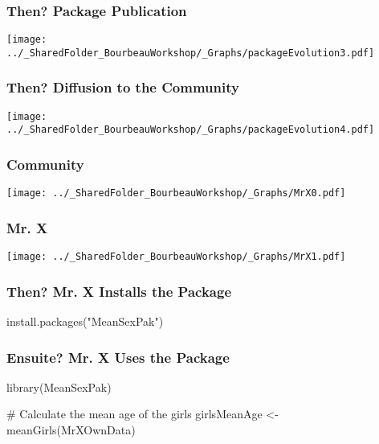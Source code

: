 \documentclass{beamer}
\begin{document}
    \begin{frame}
        \frametitle{Then? Package Publication} \vspace{1cm}
        \begin{center}
            \texttt{[image: ../\_SharedFolder\_BourbeauWorkshop/\_Graphs/packageEvolution3.pdf]}
        \end{center}
    \end{frame} 
    
    \begin{frame}
        \frametitle{Then? Diffusion to the Community} \vspace{1cm}
        \begin{center}
            \texttt{[image: ../\_SharedFolder\_BourbeauWorkshop/\_Graphs/packageEvolution4.pdf]}
        \end{center}
    \end{frame} 
    
    \begin{frame}
        \frametitle{\R Community} \vspace{1cm}
        \begin{center}
            \texttt{[image: ../\_SharedFolder\_BourbeauWorkshop/\_Graphs/MrX0.pdf]}
        \end{center}
    \end{frame}
    
    \begin{frame}
        \frametitle{Mr. X} \vspace{1cm}
        \begin{center}
            \texttt{[image: ../\_SharedFolder\_BourbeauWorkshop/\_Graphs/MrX1.pdf]}
        \end{center}
    \end{frame}

    \begin{frame}[fragile=singleslide]
        \frametitle{Then? Mr. X Installs the Package}
        \begin{code}
install.packages("MeanSexPak")
        \end{code}
    \end{frame}
    
    \begin{frame}[fragile=singleslide]
        \frametitle{Ensuite? Mr. X Uses the Package}
        \begin{code}
library(MeanSexPak)

# Calculate the mean age of the girls
girlsMeanAge <- meanGirls(MrXOwnData)
        \end{code}
    \end{frame}
    
\end{document}
